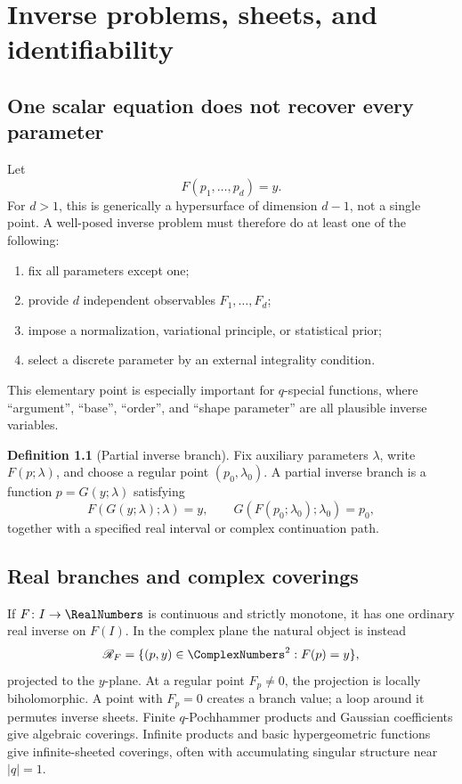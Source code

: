 \documentclass[11pt,letterpaper,oneside,openany]{book}
\theoremstyle{definition}
\newtheorem{definition}[theorem]{Definition}
\theoremstyle{remark}
\begin{document}
\chapter{Inverse problems, sheets, and identifiability}

\section{One scalar equation does not recover every parameter}
Let
\[
 F(p_1,\ldots,p_d)=y.
\]
For \(d>1\), this is generically a hypersurface of dimension \(d-1\), not a
single point.  A well-posed inverse problem must therefore do at least one of
the following:
\begin{enumerate}[label=(\roman*)]
\item fix all parameters except one;
\item provide \(d\) independent observables \(F_1,\ldots,F_d\);
\item impose a normalization, variational principle, or statistical prior;
\item select a discrete parameter by an external integrality condition.
\end{enumerate}
This elementary point is especially important for \(q\)-special functions,
where ``argument'', ``base'', ``order'', and ``shape parameter'' are all
plausible inverse variables.

\begin{definition}[Partial inverse branch]
Fix auxiliary parameters \(\lambda\), write \(F(p;\lambda)\), and choose a
regular point \((p_0,\lambda_0)\).  A partial inverse branch is a function
\(p=G(y;\lambda)\) satisfying
\[
 F(G(y;\lambda);\lambda)=y,
 \qquad G(F(p_0;\lambda_0);\lambda_0)=p_0,
\]
together with a specified real interval or complex continuation path.
\end{definition}

\section{Real branches and complex coverings}
If \(F\colon I\to\RealNumbers\) is continuous and strictly monotone, it has one ordinary
real inverse on \(F(I)\).  In the complex plane the natural object is instead
\[
 \mathscr R_F=\{(p,y)\in\ComplexNumbers^2:F(p)=y\},
\]
projected to the \(y\)-plane.  At a regular point \(F_p\ne0\), the projection
is locally biholomorphic.  A point with \(F_p=0\) creates a branch value; a loop
around it permutes inverse sheets.  Finite \(q\)-Pochhammer products and
Gaussian coefficients give algebraic coverings.  Infinite products and basic
hypergeometric functions give infinite-sheeted coverings, often with
accumulating singular structure near \(|q|=1\).
\end{document}
